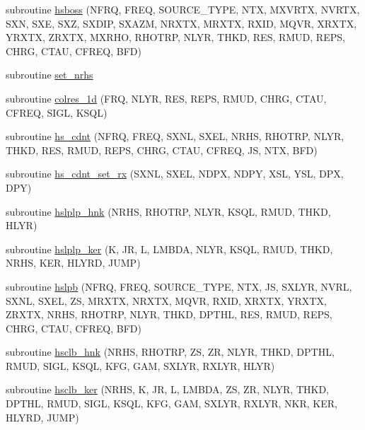 \begin{DoxyCompactItemize}
\item 
subroutine \hyperlink{Leroi_8f90_a940c66015c19ed9dab8214acf582b96c}{hsboss} (N\+F\+RQ, F\+R\+EQ, S\+O\+U\+R\+C\+E\+\_\+\+T\+Y\+PE, N\+TX, M\+X\+V\+R\+TX, N\+V\+R\+TX, S\+XN, S\+XE, S\+XZ, S\+X\+D\+IP, S\+X\+A\+ZM, N\+R\+X\+TX, M\+R\+X\+TX, R\+X\+ID, M\+Q\+VR, X\+R\+X\+TX, Y\+R\+X\+TX, Z\+R\+X\+TX, M\+X\+R\+HO, R\+H\+O\+T\+RP, N\+L\+YR, T\+H\+KD, R\+ES, R\+M\+UD, R\+E\+PS, C\+H\+RG, C\+T\+AU, C\+F\+R\+EQ, B\+FD)
\item 
subroutine \hyperlink{Leroi_8f90_a5e91ef1c525aed4231141372759cca43}{set\+\_\+nrhs}
\item 
subroutine \hyperlink{Leroi_8f90_a36d9dbba0b5eada45705f561c0035c54}{colres\+\_\+1d} (F\+RQ, N\+L\+YR, R\+ES, R\+E\+PS, R\+M\+UD, C\+H\+RG, C\+T\+AU, C\+F\+R\+EQ, S\+I\+GL, K\+S\+QL)
\item 
subroutine \hyperlink{Leroi_8f90_a94e83e050e27be19cb6d665d80c080bf}{hs\+\_\+cdnt} (N\+F\+RQ, F\+R\+EQ, S\+X\+NL, S\+X\+EL, N\+R\+HS, R\+H\+O\+T\+RP, N\+L\+YR, T\+H\+KD, R\+ES, R\+M\+UD, R\+E\+PS, C\+H\+RG, C\+T\+AU, C\+F\+R\+EQ, JS, N\+TX, B\+FD)
\item 
subroutine \hyperlink{Leroi_8f90_a052539a8cd1f0d9736453c9fb65581ca}{hs\+\_\+cdnt\+\_\+set\+\_\+rx} (S\+X\+NL, S\+X\+EL, N\+D\+PX, N\+D\+PY, X\+SL, Y\+SL, D\+PX, D\+PY)
\item 
subroutine \hyperlink{Leroi_8f90_a9418379c5cb3a81d71a2a66746f839da}{hslplp\+\_\+hnk} (N\+R\+HS, R\+H\+O\+T\+RP, N\+L\+YR, K\+S\+QL, R\+M\+UD, T\+H\+KD, H\+L\+YR)
\item 
subroutine \hyperlink{Leroi_8f90_a6a948de64e256424bee5e99021fa129c}{hslplp\+\_\+ker} (K, JR, L, L\+M\+B\+DA, N\+L\+YR, K\+S\+QL, R\+M\+UD, T\+H\+KD, N\+R\+HS, K\+ER, H\+L\+Y\+RD, J\+U\+MP)
\item 
subroutine \hyperlink{Leroi_8f90_a247cf958ed9d5aa90d05eee29e6a9582}{hslpb} (N\+F\+RQ, F\+R\+EQ, S\+O\+U\+R\+C\+E\+\_\+\+T\+Y\+PE, N\+TX, JS, S\+X\+L\+YR, N\+V\+RL, S\+X\+NL, S\+X\+EL, ZS, M\+R\+X\+TX, N\+R\+X\+TX, M\+Q\+VR, R\+X\+ID, X\+R\+X\+TX, Y\+R\+X\+TX, Z\+R\+X\+TX, N\+R\+HS, R\+H\+O\+T\+RP, N\+L\+YR, T\+H\+KD, D\+P\+T\+HL, R\+ES, R\+M\+UD, R\+E\+PS, C\+H\+RG, C\+T\+AU, C\+F\+R\+EQ, B\+FD)
\item 
subroutine \hyperlink{Leroi_8f90_ae6841c5477812a4e7255f7ed2da9a7c8}{hsclb\+\_\+hnk} (N\+R\+HS, R\+H\+O\+T\+RP, ZS, ZR, N\+L\+YR, T\+H\+KD, D\+P\+T\+HL, R\+M\+UD, S\+I\+GL, K\+S\+QL, K\+FG, G\+AM, S\+X\+L\+YR, R\+X\+L\+YR, H\+L\+YR)
\item 
subroutine \hyperlink{Leroi_8f90_ab053f1c7997499ed6fca932a2f8cbecb}{hsclb\+\_\+ker} (N\+R\+HS, K, JR, L, L\+M\+B\+DA, ZS, ZR, N\+L\+YR, T\+H\+KD, D\+P\+T\+HL, R\+M\+UD, S\+I\+GL, K\+S\+QL, K\+FG, G\+AM, S\+X\+L\+YR, R\+X\+L\+YR, N\+KR, K\+ER, H\+L\+Y\+RD, J\+U\+MP)

\end{DoxyCompactItemize}
